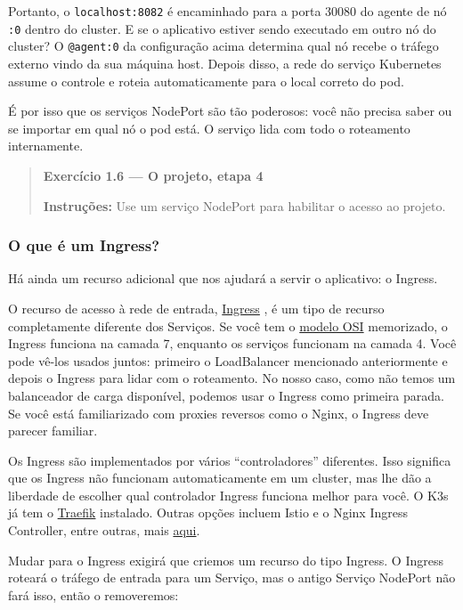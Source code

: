 \documentclass[
]{article}
\begin{document}
Portanto, o \texttt{localhost:8082} é encaminhado para a porta 30080 do
agente de nó \texttt{:0} dentro do cluster. E se o aplicativo estiver
sendo executado em outro nó do cluster? O \texttt{@agent:0} da
configuração acima determina qual nó recebe o tráfego externo vindo da
sua máquina host. Depois disso, a rede do serviço Kubernetes assume o
controle e roteia automaticamente para o local correto do pod.

É por isso que os serviços NodePort são tão poderosos: você não precisa
saber ou se importar em qual nó o pod está. O serviço lida com todo o
roteamento internamente.

\begin{quote}
\textbf{Exercício 1.6 --- O projeto, etapa 4}

\textbf{Instruções:} Use um serviço NodePort para habilitar o acesso ao
projeto.
\end{quote}

\subsubsection{O que é um Ingress?}\label{o-que-uxe9-um-ingress}

Há ainda um recurso adicional que nos ajudará a servir o aplicativo: o
Ingress.

O recurso de acesso à rede de entrada,
\href{https://kubernetes.io/docs/concepts/services-networking/ingress/}{Ingress}
, é um tipo de recurso completamente diferente dos Serviços. Se você tem
o \href{https://en.wikipedia.org/wiki/OSI_model}{modelo OSI} memorizado,
o Ingress funciona na camada 7, enquanto os serviços funcionam na camada
4. Você pode vê-los usados juntos: primeiro o LoadBalancer mencionado
anteriormente e depois o Ingress para lidar com o roteamento. No nosso
caso, como não temos um balanceador de carga disponível, podemos usar o
Ingress como primeira parada. Se você está familiarizado com proxies
reversos como o Nginx, o Ingress deve parecer familiar.

Os Ingress são implementados por vários ``controladores'' diferentes.
Isso significa que os Ingress não funcionam automaticamente em um
cluster, mas lhe dão a liberdade de escolher qual controlador Ingress
funciona melhor para você. O K3s já tem o
\href{https://traefik.io/traefik}{Traefik} instalado. Outras opções
incluem Istio e o Nginx Ingress Controller, entre outras, mais
\href{https://kubernetes.io/docs/concepts/services-networking/ingress-controllers/}{aqui}.

Mudar para o Ingress exigirá que criemos um recurso do tipo Ingress. O
Ingress roteará o tráfego de entrada para um Serviço, mas o antigo
Serviço NodePort não fará isso, então o removeremos:
\end{document}
